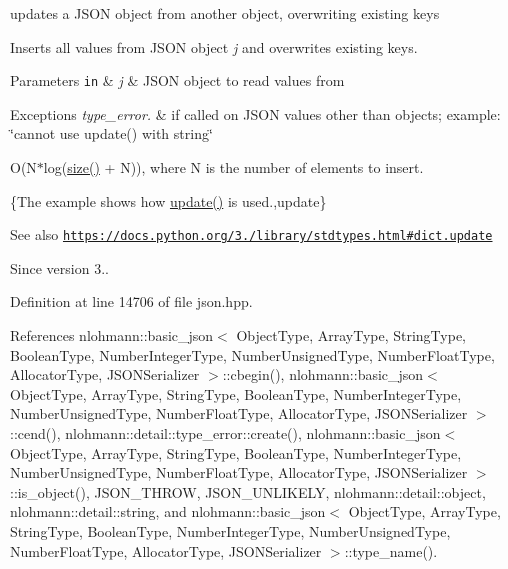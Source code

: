 updates a J\+S\+ON object from another object, overwriting existing keys 

Inserts all values from J\+S\+ON object {\itshape j} and overwrites existing keys.


\begin{DoxyParams}[1]{Parameters}
\mbox{\tt in}  & {\em j} & J\+S\+ON object to read values from\\
\hline
\end{DoxyParams}

\begin{DoxyExceptions}{Exceptions}
{\em type\+\_\+error.} & if called on J\+S\+ON values other than objects; example\+: {\ttfamily \char`\"{}cannot use update() with string\char`\"{}}\\
\hline
\end{DoxyExceptions}
O(N$\ast$log(\hyperlink{classnlohmann_1_1basic__json_a25e27ad0c6d53c01871c5485e1f75b96}{size()} + N)), where N is the number of elements to insert.

\{The example shows how {\ttfamily \hyperlink{classnlohmann_1_1basic__json_a1cfa9ae5e7c2434cab4cfe69bffffe11}{update()}} is used.,update\}

\begin{DoxySeeAlso}{See also}
\href{https://docs.python.org/3.6/library/stdtypes.html#dict.update}{\tt https\+://docs.\+python.\+org/3./library/stdtypes.\+html\#dict.\+update}
\end{DoxySeeAlso}
\begin{DoxySince}{Since}
version 3.. 
\end{DoxySince}


Definition at line 14706 of file json.\+hpp.



References nlohmann\+::basic\+\_\+json$<$ Object\+Type, Array\+Type, String\+Type, Boolean\+Type, Number\+Integer\+Type, Number\+Unsigned\+Type, Number\+Float\+Type, Allocator\+Type, J\+S\+O\+N\+Serializer $>$\+::cbegin(), nlohmann\+::basic\+\_\+json$<$ Object\+Type, Array\+Type, String\+Type, Boolean\+Type, Number\+Integer\+Type, Number\+Unsigned\+Type, Number\+Float\+Type, Allocator\+Type, J\+S\+O\+N\+Serializer $>$\+::cend(), nlohmann\+::detail\+::type\+\_\+error\+::create(), nlohmann\+::basic\+\_\+json$<$ Object\+Type, Array\+Type, String\+Type, Boolean\+Type, Number\+Integer\+Type, Number\+Unsigned\+Type, Number\+Float\+Type, Allocator\+Type, J\+S\+O\+N\+Serializer $>$\+::is\+\_\+object(), J\+S\+O\+N\+\_\+\+T\+H\+R\+OW, J\+S\+O\+N\+\_\+\+U\+N\+L\+I\+K\+E\+LY, nlohmann\+::detail\+::object, nlohmann\+::detail\+::string, and nlohmann\+::basic\+\_\+json$<$ Object\+Type, Array\+Type, String\+Type, Boolean\+Type, Number\+Integer\+Type, Number\+Unsigned\+Type, Number\+Float\+Type, Allocator\+Type, J\+S\+O\+N\+Serializer $>$\+::type\+\_\+name().


